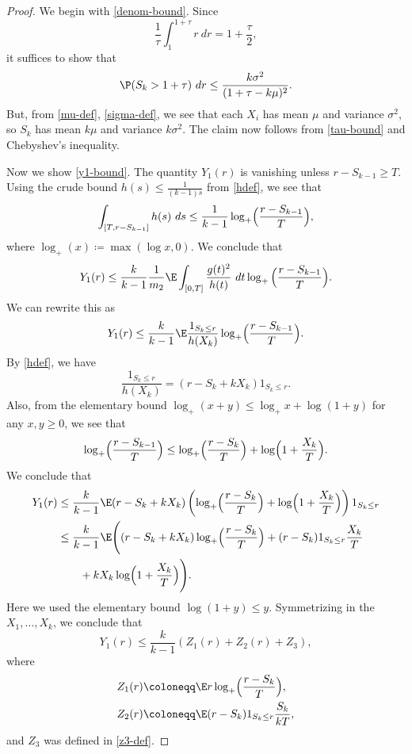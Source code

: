 \begin{proof}
We begin with \eqref{denom-bound}.  Since
$$ \frac{1}{\tau} \int_1^{1+\tau} r\ dr = 1+\frac{\tau}{2},$$
it suffices to show that
$$
\P( S_k > 1+\tau)\ dr \leq \frac{k\sigma^2}{(1+\tau-k\mu)^2}.
$$
But, from \eqref{mu-def}, \eqref{sigma-def}, we see that each $X_i$ has mean $\mu$ and variance $\sigma^2$, so $S_k$ has mean $k\mu$ and variance $k\sigma^2$.  The claim now follows from \eqref{tau-bound} and Chebyshev's inequality.

Now we show \eqref{y1-bound}.  The quantity $Y_1(r)$ is vanishing unless $r-S_{k-1} \geq T$.  Using the crude bound $h(s) \leq \frac{1}{(k-1)s}$ from \eqref{hdef}, we see that
$$ \int_{[T,r-S_{k-1}]} h(s)\ ds \leq \frac{1}{k-1} \log_+ \Bigl(\frac{r-S_{k-1}}{T}\Bigr),$$
where $\log_+(x) \coloneqq \max(\log x, 0)$.  We conclude that
$$ Y_1(r) \leq \frac{k}{k-1} \frac{1}{m_2} \E \int_{[0,T]} \frac{g(t)^2}{h(t)}\ dt \log_+ \Big(\frac{r-S_{k-1}}{T}\Bigr).$$
We can rewrite this as
$$ Y_1(r) \leq \frac{k}{k-1} \E \frac{1_{S_k \leq r}}{h(X_k)} \log_+\Bigl( \frac{r-S_{k-1}}{T}\Bigr).$$
By \eqref{hdef}, we have
$$ \frac{1_{S_k \leq r}}{h(X_k)} = (r-S_k+kX_k) 1_{S_k \leq r}.$$
Also, from the elementary bound $\log_+(x+y) \leq \log_+ x + \log(1+y)$ for any $x,y \geq 0$, we see that
$$ \log_+ \Bigl(\frac{r-S_{k-1}}{T}\Bigr) \leq \log_+ \Bigl(\frac{r-S_{k}}{T}\Bigr) + \log\Bigl(1+\frac{X_k}{T}\Bigr).$$
We conclude that
\begin{align*}
Y_1(r) &\leq \frac{k}{k-1} \E (r-S_k+kX_k) \left( \log_+ \Bigl(\frac{r-S_{k}}{T}\Bigr) + \log\Bigl(1+\frac{X_k}{T}\Bigr) \right) 1_{S_k \leq r}\\
&\leq \frac{k}{k-1} \E \Biggl(  (r-S_k+kX_k) \log_+\Bigl( \frac{r-S_{k}}{T}\Bigr) + (r-S_k)1_{S_k \leq r} \frac{X_k}{T} \\
&\qquad + k X_k \log\Bigl(1+\frac{X_k}{T}\Bigr) \Biggr).
\end{align*}
Here we used the elementary bound $\log(1+y) \leq y$.  Symmetrizing in the $X_1,\dots,X_k$, we conclude that
\begin{equation}\label{y1r}
 Y_1(r) \leq \frac{k}{k-1} (Z_1(r) + Z_2(r) + Z_3),
\end{equation}
where
\begin{align*}
Z_1(r) &\coloneqq \E r \log_+ \Bigl(\frac{r-S_k}{T}\Bigr), \\
Z_2(r) &\coloneqq \E (r-S_k) 1_{S_k \leq r} \frac{S_k}{kT} ,
\end{align*}
and $Z_3$ was defined in \eqref{z3-def}.


\end{proof}
